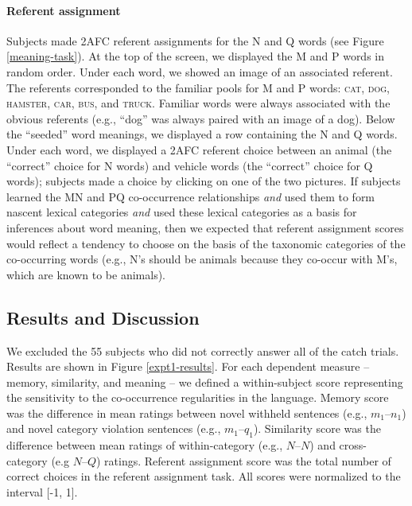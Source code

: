\documentclass[man,floatsintext]{apa6}
\begin{document}
\paragraph{Referent assignment}
Subjects made 2AFC referent assignments for the N and Q words (see Figure \ref{meaning-task}). At the top of the screen, we displayed the M and P words in random order. Under each word, we showed an image of an associated referent. The referents corresponded to the familiar pools for M and P words: \textsc{cat}, \textsc{dog}, \textsc{hamster}, \textsc{car}, \textsc{bus}, and \textsc{truck}. Familiar words were always associated with the obvious referents (e.g., ``dog'' was always paired with an image of a dog). Below the ``seeded'' word meanings, we displayed a row containing the N and Q words. Under each word, we displayed a 2AFC referent choice between an animal (the ``correct'' choice for N words) and vehicle words (the ``correct'' choice for Q words); subjects made a choice by clicking on one of the two pictures. If subjects learned the MN and PQ co-occurrence relationships \emph{and} used them to form nascent lexical categories \emph{and} used these lexical categories as a basis for inferences about word meaning, then we expected that referent assignment scores would reflect a tendency to choose on the basis of the taxonomic categories of the co-occurring words (e.g., N's should be animals because they co-occur with M's, which are known to be animals).

\subsection{Results and Discussion}
We excluded the 55 subjects who did not correctly answer all of the catch trials. Results are shown in Figure \ref{expt1-results}. For each dependent measure -- memory, similarity, and meaning -- we defined a within-subject score representing the sensitivity to the co-occurrence regularities in the language. Memory score was the difference in mean ratings between novel withheld sentences (e.g., $m_1$--$n_1$) and novel category violation sentences (e.g., $m_1$--$q_1$). Similarity score was the difference between mean ratings of within-category (e.g., $N$--$N$) and cross-category (e.g $N$--$Q$) ratings. Referent assignment score was the total number of correct choices in the referent assignment task. All scores were normalized to the interval [-1, 1].
\end{document}
